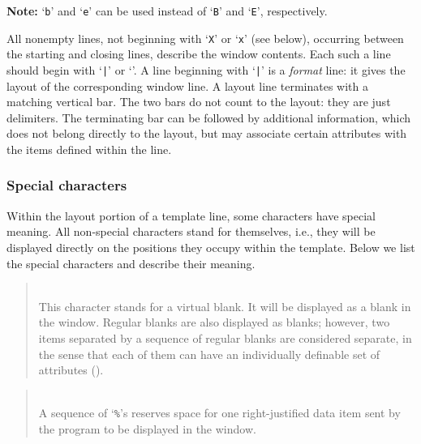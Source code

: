 \medskip

\noindent
{\bf Note:} `{\tt b}' and `{\tt e}' can be used instead of `{\tt B}' and
`{\tt E}', respectively.

\medskip

All nonempty lines, not beginning with `{\tt X}' or `{\tt x}' (see below),
occurring between the
starting and closing lines, describe the window contents.
Each such a line should begin with `{\tt |}' or `{\tt *}'.
A line beginning with `{\tt |}' is a {\em format\/} line: it gives the
layout of the corresponding window line.
A layout line terminates with a matching vertical bar.
The two bars do not count to the layout: they are just delimiters.
The terminating bar can be followed by additional information, which does
not belong directly to the layout, but may associate certain attributes
with the items defined within the line.

\subsubsection{Special characters}
\label{rm_ds_tp_sc}

Within the layout portion of a template line, some characters have special
meaning.
All non-special characters stand for themselves, i.e.,
they will be displayed directly on the positions they occupy within the
template.
Below we list the special characters and describe their meaning.

\medskip

\begin{quote}
\noindent{}\\ \hspace{0in}
This character stands for a virtual blank.
It will be displayed as a blank in the window.
Regular blanks are also displayed as blanks; however, two items separated
by a sequence of regular blanks are considered separate, in the sense that
each of them can have an individually definable set of attributes
().
\end{quote}

\begin{quote}
\noindent\hspace{-0.35in}{\bf {\tt \%}}\\ \hspace{0in}
A sequence of `{\tt \%}'s reserves space for one right-justified
data item sent by the {\smurph} program to be displayed in the window.
\end{quote}

